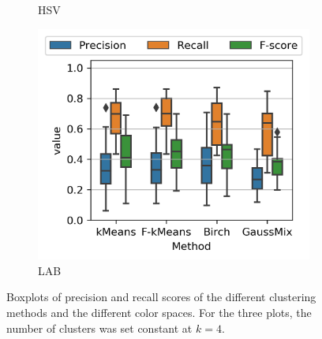 \documentclass[journal]{IEEEtran}
\begin{document}
\begin{figure}[!t]
\begin{subfigure}[b]{0.30\textwidth}
        \caption{HSV}
    \end{subfigure}\hfill     
    \begin{subfigure}[b]{0.30\textwidth}
    	\centering
        \includegraphics[width=\textwidth]{PrecisionRecall_boxplot_const_nclusters_LAB}
        \caption{LAB}
    \end{subfigure} 
        	    
    \caption{Boxplots of precision and recall scores of the different clustering methods and the different color spaces. For the three plots, the number of clusters was set constant at $k=4$.}\label{fig:PR_boxplot_scores}    
\end{figure}
\end{document}

